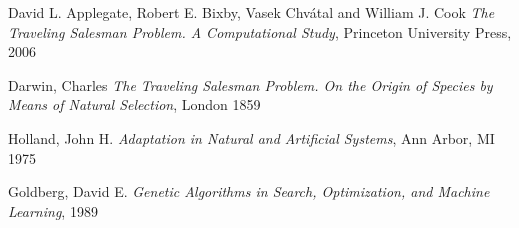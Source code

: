 \documentclass[
article,			%
11pt,				%
oneside,			%
a4paper,			%
english,			%
brazil,				%
sumario=tradicional
]{article}
\begin{document}
	\begin{thebibliography}{4}
		
		
		David L. Applegate, Robert E. Bixby, Vasek Chvátal and William J. Cook
		\emph{The Traveling Salesman Problem. A Computational Study},
		Princeton University Press,
		2006
		
		Darwin, Charles
		\emph{The Traveling Salesman Problem. On the Origin of Species by Means of Natural Selection},
		London
		1859
		
		Holland, John H.
		\emph{Adaptation in Natural and Artificial Systems},
		Ann Arbor, MI
		1975
		
		Goldberg, David E.
		\emph{Genetic Algorithms in Search, Optimization, and Machine Learning},
		1989
			
	\end{thebibliography}
	
\end{document}
